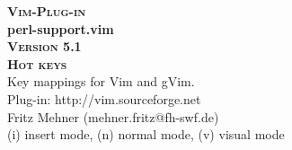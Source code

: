 \documentclass[oneside,10pt,landscape,DIV17]{scrartcl}
\newcommand{\Pluginversion}{5.1}
\begin{document}
%

\begin{multicols}{3}
%
\begin{center}
%
\textbf{\textsc{\small{Vim-Plug-in}}}\\
\textbf{\LARGE{perl-support.vim}}\\
\textbf{\textsc{\small{Version \Pluginversion}}}\\
\vspace{5mm}%
\textbf{\textsc{\Huge{Hot keys}}}\\ 
\vspace{5mm}%
Key mappings for Vim and gVim.\\
Plug-in: http://vim.sourceforge.net\\
Fritz Mehner (mehner.fritz@fh-swf.de)\\
\vspace{1.0mm}
{\normalsize (i)} insert mode, {\normalsize (n)} normal mode, {\normalsize (v)} visual mode\\
\vspace{4.0mm}


\end{center}
\end{multicols}
\end{document}
